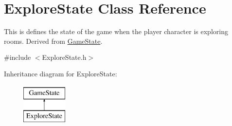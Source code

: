 \hypertarget{classExploreState}{\section{Explore\-State Class Reference}
\label{classExploreState}
}


This is defines the state of the game when the player character is exploring rooms. Derived from \hyperlink{classGameState}{Game\-State}.  




{\ttfamily \#include $<$Explore\-State.\-h$>$}

Inheritance diagram for Explore\-State\-:\begin{figure}[H]
\begin{center}
\leavevmode
\includegraphics[height=2.000000cm]{classExploreState}
\end{center}
\end{figure}
